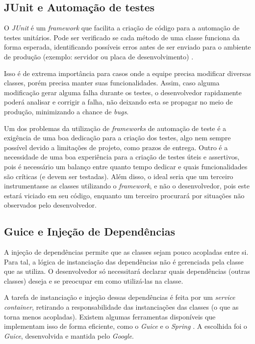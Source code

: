     \subsection{JUnit e Automação de testes}
    \label{methodology:tools:junit}

      O \textit{JUnit} é um \textit{framework} que facilita a criação de código para a automação de testes unitários. Pode ser verificado se cada método de uma classe funciona da forma esperada, identificando possíveis erros antes de ser enviado para o ambiente de produção (exemplo: servidor ou placa de desenvolvimento) \cite{developer-junit}.

      Isso é de extrema importância para casos onde a equipe precisa modificar diversas classes, porém precisa manter suas funcionalidades. Assim, caso alguma modificação gerar alguma falha durante os testes, o desenvolvedor rapidamente poderá analisar e corrigir a falha, não deixando esta se propagar no meio de produção, minimizando a chance de \textit{bugs}.

      Um dos problemas da utilização de \textit{frameworks} de automação de teste é a exigência de uma boa dedicação para a criação dos testes, algo nem sempre possível devido a limitações de projeto, como prazos de entrega. Outro é a necessidade de uma boa experiência para a criação de testes úteis e assertivos, pois é necessário um balanço entre quanto tempo dedicar e quais funcionalidades são críticas (e devem ser testadas). Além disso, o ideal seria que um terceiro instrumentasse as classes utilizando o \textit{framework}, e não o desenvolvedor, pois este estará viciado em seu código, enquanto um terceiro procurará por situações não observados pelo desenvolvedor.

    \subsection{Guice e Injeção de Dependências}
    \label{methodology:tools:guice}

      A injeção de dependências permite que as classes sejam pouco acopladas entre si. Para tal, a lógica de instanciação das dependências não é gerenciada pela classe que as utiliza. O desenvolvedor só necessitará declarar quais dependências (outras classes) deseja e se preocupar em como utilizá-las na classe.

      A tarefa de instanciação e injeção dessas dependências é feita por um \textit{service container}, retirando a responsabilidade das instanciações das classes (o que as torna menos acopladas). Existem algumas ferramentas disponíveis que implementam isso de forma eficiente, como o \textit{Guice} e o \textit{Spring} \cite{developer-guice}. A escolhida foi o \textit{Guice}, desenvolvida e mantida pelo \textit{Google}.

